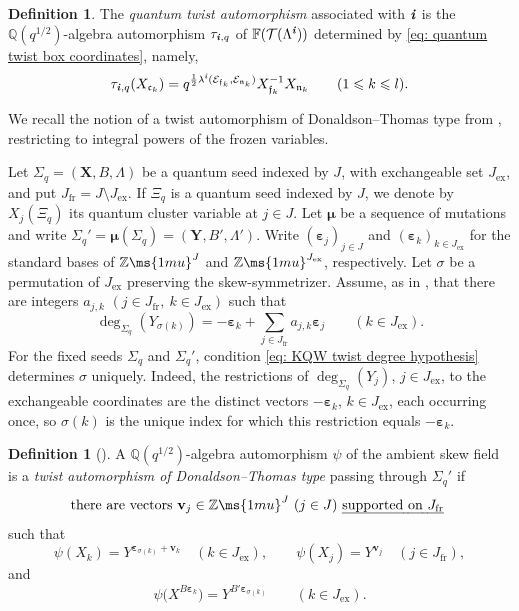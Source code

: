 \documentclass[12pt, leqno]{amsart}
\numberwithin{equation}{section}
\theoremstyle{plain}
\theoremstyle{definition}
\newtheorem{definition}[lemma]{Definition}
\renewcommand{\le}{\leqslant}
\newcommand{\ex}{\mathrm{ex}}
\newcommand{\fr}{\mathrm{fr}}
\newcommand{\Q}{\mathbb{Q}}
\newcommand{\Z}{\mathbb{Z}\ms{1mu}}
\newcommand{\ve}{\boldsymbol{\varepsilon}}
\newcommand{\ii}{ \textbf{\textit{i}}}
\newcommand{\frakc}{\mathfrak{c}}
\newcommand{\frakf}{\mathfrak{f}}
\newcommand{\frakn}{\mathfrak{n}}
\newcommand{\bbF}{\mathbb{F}}
\newcommand{\bmu}{{\boldsymbol{\mu}}}
\newcommand{\bfX}{\mathbf{X}}
\newcommand{\bfY}{\mathbf{Y}}
\newcommand{\bfv}{\mathbf{v}}
\newcommand{\calE}{\mathcal{E}}
\newcommand{\calT}{\mathcal{T}}
\begin{document}
\begin{definition}
\label{def: arbitrary positive word twist}
The \emph{quantum twist automorphism} associated with $\ii$ is
the $\Q(q^{1/2})$-algebra automorphism $\tau_{\ii,q}$ of
$\bbF(\calT(\Lambda^\ii))$ determined by
\eqref{eq: quantum twist box coordinates}, namely,
\[
\tau_{\ii,q}(X_{\frakc_k})
=
q^{\frac12\lambda^\ii(\calE_{\frakf_k},\calE_{\frakn_k})}
X_{\frakf_k}^{-1}X_{\frakn_k}
\qquad(1\le k\le l).
\]
\end{definition}


We recall the notion of a twist automorphism of
Donaldson--Thomas type from \cite{KimuraQinWei}, restricting to
integral powers of the frozen variables.

Let $\Sigma_q=(\bfX,B,\Lambda)$ be a quantum seed indexed by $J$,
with exchangeable set $J_\ex$, and put $J_{\fr}=J\setminus J_\ex$.
If $\Xi_q$ is a quantum seed indexed by $J$, we denote by
$X_j(\Xi_q)$ its quantum cluster variable at $j\in J$.
Let $\bmu$ be a sequence of mutations and write
$\Sigma_q'=\bmu(\Sigma_q)=(\bfY,B',\Lambda')$.
Write $(\ve_j)_{j\in J}$ and $(\ve_k)_{k\in J_\ex}$ for the
standard bases of $\Z^J$ and $\Z^{J_\ex}$, respectively.
Let $\sigma$ be a permutation of $J_\ex$ preserving the
skew-symmetrizer.  Assume, as in \cite[Section~2.12]{KimuraQinWei}, 
that there are integers $a_{j,k}$
$(j\in J_{\fr},\ k\in J_\ex)$ such that
\begin{equation}
\deg_{\Sigma_q}(Y_{\sigma(k)})
=-\ve_k+\sum_{j\in J_{\fr}}a_{j,k}\ve_j
\qquad(k\in J_\ex).
\label{eq: KQW twist degree hypothesis}
\end{equation}
For the fixed seeds $\Sigma_q$ and $\Sigma_q'$, condition
\eqref{eq: KQW twist degree hypothesis} determines $\sigma$
uniquely.  Indeed, the restrictions of $\deg_{\Sigma_q}(Y_j)$,
$j\in J_\ex$, to the exchangeable coordinates are the distinct
vectors $-\ve_k$, $k\in J_\ex$, each occurring once, so
$\sigma(k)$ is the unique index for which this restriction equals
$-\ve_k$.

\begin{definition}[{\cite[Definitions~3.3 and~3.15 and Section~5.1]{KimuraQinWei}}]
\label{def: DT type twist integral frozen variables}
A $\Q(q^{1/2})$-algebra automorphism $\psi$ of the ambient skew
field is a \emph{twist automorphism of Donaldson--Thomas type}
passing through $\Sigma_q'$ if
\[
\text{there are vectors
$\bfv_j\in\Z^J$ $(j\in J)$ \emph{supported on $J_{\fr}$} }
\] such that
\[
\psi(X_k)=Y^{\ve_{\sigma(k)}+\bfv_k}\quad(k\in J_\ex),
\qquad
\psi(X_j)=Y^{\bfv_j}\quad(j\in J_{\fr}),
\]
and
\[
\psi\bigl(X^{B\ve_k}\bigr)=Y^{B'\ve_{\sigma(k)}}
\qquad(k\in J_\ex).
\]
\end{definition}
\end{document}
